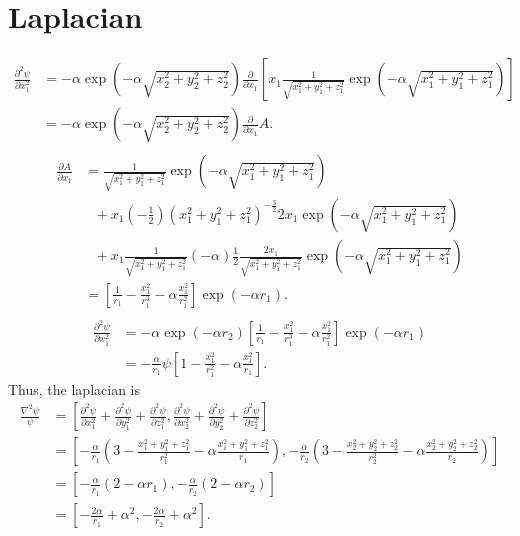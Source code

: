\section{Laplacian}
\begin{align}
\frac{\partial^2 \psi}{\partial x_1^2} 
&= -\alpha \exp\left(-\alpha \sqrt{x_2^2 + y_2^2 + z_2^2} \right) 
\frac{\partial}{\partial x_1} \left[   
    x_1 \frac{1}{\sqrt{x_1^2 + y_1^2 + z_1^2}} \exp \left(-\alpha \sqrt{x_1^2 + y_1^2 + z_1^2}\right) 
\right] \\
&= -\alpha \exp\left(-\alpha \sqrt{x_2^2 + y_2^2 + z_2^2} \right) \frac{\partial}{\partial x_1} A.\\
\end{align}
\begin{align}
\frac{\partial A}{\partial x_1} 
&= \frac{1}{\sqrt{x_1^2 + y_1^2 + z_1^2}} \exp \left(-\alpha \sqrt{x_1^2 + y_1^2 + z_1^2}\right)  \\
    &~~~+ x_1  \left(-\frac{1}{2}\right) (x_1^2 + y_1^2 + z_1^2)^{-\frac{3}{2}} 2x_1 \exp\left(-\alpha \sqrt{x_1^2 + y_1^2 + z_1^2}\right) \\
    &~~~+ x_1 \frac{1}{\sqrt{x_1^2 + y_1^2 + z_1^2}} (-\alpha) \frac{1}{2}  \frac{2x_1}{\sqrt{x_1^2 + y_1^2 + z_1^2}} \exp\left(-\alpha \sqrt{x_1^2 + y_1^2 + z_1^2}\right) \\
&= \left[\frac{1}{r_1} - \frac{x_1^2}{r_1^3} - \alpha \frac{x_1^2}{r_1^2}\right] \exp(-\alpha r_1). \\
\end{align}
\begin{align}
\frac{\partial^2 \psi}{\partial x_1^2} &= -\alpha \exp\left(-\alpha r_2 \right)  \left[\frac{1}{r_1} - \frac{x_1^2}{r_1^3} - \alpha \frac{x_1^2}{r_1^2}\right] \exp(-\alpha r_1) \\
&= -\frac{\alpha}{r_1} \psi \left[1 - \frac{x_1^2}{r_1^2} - \alpha\frac{x_1^2}{r_1} \right].
\end{align}
Thus, the laplacian is
\begin{align}
\frac{\nabla^2 \psi}{\psi} &= \left[
\frac{\partial^2 \psi}{\partial x_1^2} + \frac{\partial^2 \psi}{\partial y_1^2} + \frac{\partial^2 \psi}{\partial z_1^2}, 
\frac{\partial^2 \psi}{\partial x_2^2} + \frac{\partial^2 \psi}{\partial y_2^2} + \frac{\partial^2 \psi}{\partial z_2^2}
\right] \\
&= \left[
-\frac{\alpha}{r_1}\left(3 - \frac{x_1^2 + y_1^2 + z_1^2}{r_1^2} - \alpha \frac{x_1^2 + y_1^2 + z_1^2}{r_1}\right),
-\frac{\alpha}{r_2}\left(3 - \frac{x_2^2 + y_2^2 + z_2^2}{r_2^2} - \alpha \frac{x_2^2 + y_2^2 + z_2^2}{r_2}\right)
\right] \\
&= \left[-\frac{\alpha}{r_1} (2 - \alpha r_1), -\frac{\alpha}{r_2}(2 - \alpha r_2) \right] \\
&= \boxed{\left[-\frac{2 \alpha}{r_1} + \alpha^2, -\frac{2 \alpha}{r_2} + \alpha^2 \right].}
\end{align}
